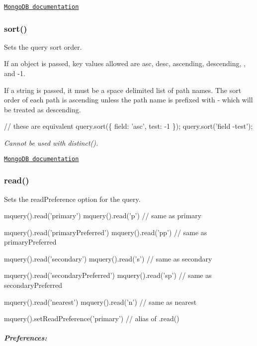 \href{http://docs.mongodb.org/manual/reference/method/cursor.skip/}{\tt Mongo\+DB documentation}

\subsubsection*{sort()}

Sets the query sort order.

If an object is passed, key values allowed are {\ttfamily asc}, {\ttfamily desc}, {\ttfamily ascending}, {\ttfamily descending}, {}, and {\ttfamily -\/1}.

If a string is passed, it must be a space delimited list of path names. The sort order of each path is ascending unless the path name is prefixed with {\ttfamily -\/} which will be treated as descending.


\begin{DoxyCode}
// these are equivalent
query.sort(\{ field: 'asc', test: -1 \});
query.sort('field -test');
\end{DoxyCode}


{\itshape Cannot be used with {\ttfamily distinct()}.}

\href{http://docs.mongodb.org/manual/reference/method/cursor.sort/}{\tt Mongo\+DB documentation}

\subsubsection*{read()}

Sets the read\+Preference option for the query.


\begin{DoxyCode}
mquery().read('primary')
mquery().read('p')  // same as primary

mquery().read('primaryPreferred')
mquery().read('pp') // same as primaryPreferred

mquery().read('secondary')
mquery().read('s')  // same as secondary

mquery().read('secondaryPreferred')
mquery().read('sp') // same as secondaryPreferred

mquery().read('nearest')
mquery().read('n')  // same as nearest

mquery().setReadPreference('primary') // alias of .read()
\end{DoxyCode}


\subparagraph*{Preferences\+:}


